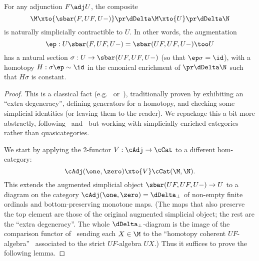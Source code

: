 \begin{lem}\label{thm:bar-simpcontr}
  For any adjunction $F\adj U$, the composite
  \[ \M \xto{\sbar(F,UF,U-)} \pr\dDelta\M \xto{U} \pr\dDelta\N \]
  is naturally simplicially contractible to $U$.
  In other words, the augmentation
  \[ \ep : U\sbar(F,UF,U-) = \sbar(UF,UF,U-) \too U \]
  has a natural section $\sigma:U\to \sbar(UF,UF,U-)$ (so that $\ep\sigma=\id$), with a homotopy $H:\sigma\ep \sim \id$ in the canonical enrichment of $\pr\dDelta\N$ such that $H\sigma$ is constant.
\end{lem}
\begin{proof}
  This is a classical fact (e.g.~\cite[Proposition 9.8]{may:goils} or~\cite[--7]{meyer:bar_i}), traditionally proven by exhibiting an ``extra degeneracy'', defining generators for a homotopy, and checking some simplicial identities (or leaving them to the reader).
  We repackage this a bit more abstractly, following~\cite{rv:hcadj-ftm} and~\cite[Chapters 9 and 10]{rv:elements} but working with simplicially enriched categories rather than quasicategories.

  We start by applying the 2-functor $V : \cAdj\to\cCat$ to a different hom-category:
  \[ \cAdj(\one,\zero) \xto{V} \cCat(\M,\N). \]
  This extends the augmented simplicial object $\sbar(UF,UF,U-) \to U$ to a diagram on the category $\cAdj(\one,\zero) = \dDelta_\bot$ of non-empty finite ordinals and bottom-preserving monotone maps.
  (The maps that also preserve the top element are those of the original augmented simplicial object; the rest are the ``extra degeneracy''.
  The whole $\dDelta_\bot$-diagram is the image of the comparison functor of~\cite[]{rv:hcadj-ftm} sending each $X\in\M$ to the ``homotopy coherent $U F$-algebra''~\cite[eq.~(6.1.12)]{rv:hcadj-ftm} associated to the strict $U F$-algebra $U X$.)
  Thus it suffices to prove the following lemma.
\end{proof}

